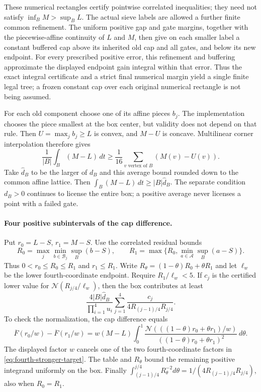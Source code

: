 These numerical rectangles certify pointwise correlated inequalities;
they need not satisfy $\inf_B M>\sup_B L$.  The actual sieve labels
are allowed a further finite common refinement.  The uniform positive
gap and gate margins, together with the piecewise-affine continuity of
$L$ and $M$, then give on each smaller label a constant buffered cap
above its inherited old cap and all gates, and below its new endpoint.
For every prescribed positive error, this refinement and buffering
approximate the displayed endpoint gain integral within that error.
Thus the exact integral certificate and a strict final numerical
margin yield a single finite legal tree; a frozen constant cap over
each original numerical rectangle is not being assumed.

For each old component choose one of its affine pieces $b_j$.
The implementation chooses the piece smallest at the box center,
but validity does not depend on that rule.  Then
$U=\max_j b_j\ge L$ is convex, and $M-U$ is concave.  Multilinear
corner interpolation therefore gives
\[
 \frac1{|B|}\int_B(M-L)\,dt
 \ge\frac1{16}\sum_{v\text{ vertex of }B}(M(v)-U(v)).
\]
Take $\widehat d_B$ to be the larger of $d_B$ and this average
bound rounded down to the common affine lattice.  Then
$\int_B(M-L)\,dt\ge|B|\widehat d_B$.
The separate condition $d_B>0$ continues to license the entire box;
a positive average never licenses a point with a failed gate.

\paragraph{Four positive subintervals of the cap difference.}
Put $r_0=L-S$, $r_1=M-S$.  Use the correlated residual bounds
\[
 R_0=\max_j\min_{b\in\mathcal B_j}\sup_B(b-S),\qquad
 R_1=\max\{R_0,\min_{a\in\mathcal A}\sup_B(a-S)\}.
\]
Thus $0<r_0\le R_0\le R_1$ and $r_1\le R_1$.
Write $R_\theta=(1-\theta)R_0+\theta R_1$ and let
$\ell_w$ be the lower fourth-coordinate endpoint.  Require
$R_1/\ell_w<5$.  If $c_j$ is the certified lower value for
$\mathcal N(R_{j/4}/\ell_w)$, then the box contributes at least
\begin{equation}\label{eq:fourth-stronger-box}
 \frac{4|B|\widehat d_B}{\prod_{i=1}^4 u_i}
 \sum_{j=1}^4\frac{c_j}{4R_{(j-1)/4}R_{j/4}}.
\end{equation}
To check the normalization, the cap difference equals
\[
 \overline F(r_0/w)-\overline F(r_1/w)
 =w(M-L)\int_0^1
 \frac{\mathcal N(((1-\theta)r_0+\theta r_1)/w)}
 {((1-\theta)r_0+\theta r_1)^2}\,d\theta.
\]
The displayed factor $w$ cancels one of the two fourth-coordinate
factors in \eqref{eq:fourth-stronger-target}.
The table and $R_\theta$ bound the remaining positive integrand
uniformly on the box.  Finally
$\int_{(j-1)/4}^{j/4}R_\theta^{-2}d\theta
=1/(4R_{(j-1)/4}R_{j/4})$, also when $R_0=R_1$.

